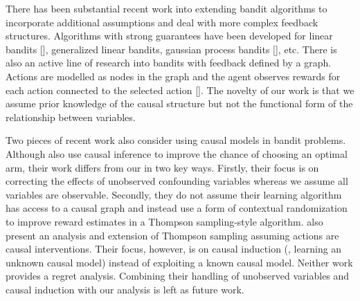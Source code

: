 There has been substantial recent work into extending bandit algorithms to incorporate additional assumptions and deal with more complex feedback structures. Algorithms with strong guarantees have been developed for linear bandits [], generalized linear bandits, gaussian process bandits [], etc. There is also an active line of research into bandits with feedback defined by a graph. Actions are modelled as nodes in the graph and the agent observes rewards for each action connected to the selected action []. The novelty of our work is that we assume prior knowledge of the causal structure but not the functional form of the relationship between variables.   


Two pieces of recent work also consider using causal models in bandit problems.
Although \citet{Bareinboim2015} also use causal inference to improve the chance of choosing an optimal arm, their work differs from our in two key ways. Firstly, their focus is on correcting the effects of unobserved confounding variables whereas we assume all variables are observable. Secondly, they do not assume their learning algorithm has access to a causal graph and instead use a form of contextual randomization to improve reward estimates in a Thompson sampling-style algorithm. \citet{Ortega2014thompson} also present an analysis and extension of Thompson sampling assuming actions are causal interventions. Their focus, however, is on causal induction (\ie, learning an unknown causal model) instead of exploiting a known causal model. Neither work provides a regret analysis. 
Combining their handling of unobserved variables and causal induction with our analysis is left as future work.


